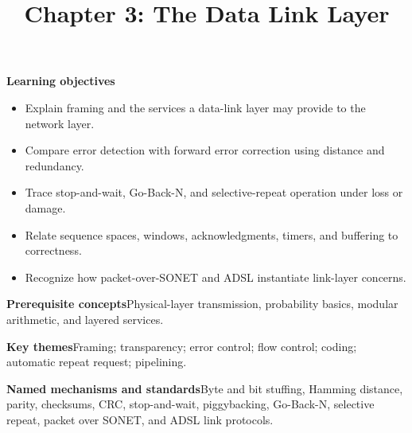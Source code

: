 \documentclass[10pt,letterpaper]{article}
\title{Chapter 3: The Data Link Layer}
\author{}
\date{}
\begin{document}
\maketitle
{}
\begin{overviewbox}
\textbf{Learning objectives}\begin{itemize}
  \item Explain framing and the services a data-link layer may provide to the network layer.
  \item Compare error detection with forward error correction using distance and redundancy.
  \item Trace stop-and-wait, Go-Back-N, and selective-repeat operation under loss or damage.
  \item Relate sequence spaces, windows, acknowledgments, timers, and buffering to correctness.
  \item Recognize how packet-over-SONET and ADSL instantiate link-layer concerns.
\end{itemize}
\textbf{Prerequisite concepts}\quad Physical-layer transmission, probability basics, modular arithmetic, and layered services.\par
\textbf{Key themes}\quad Framing; transparency; error control; flow control; coding; automatic repeat request; pipelining.\par
\textbf{Named mechanisms and standards}\quad Byte and bit stuffing, Hamming distance, parity, checksums, CRC, stop-and-wait, piggybacking, Go-Back-N, selective repeat, packet over SONET, and ADSL link protocols.
\end{overviewbox}

\end{document}
